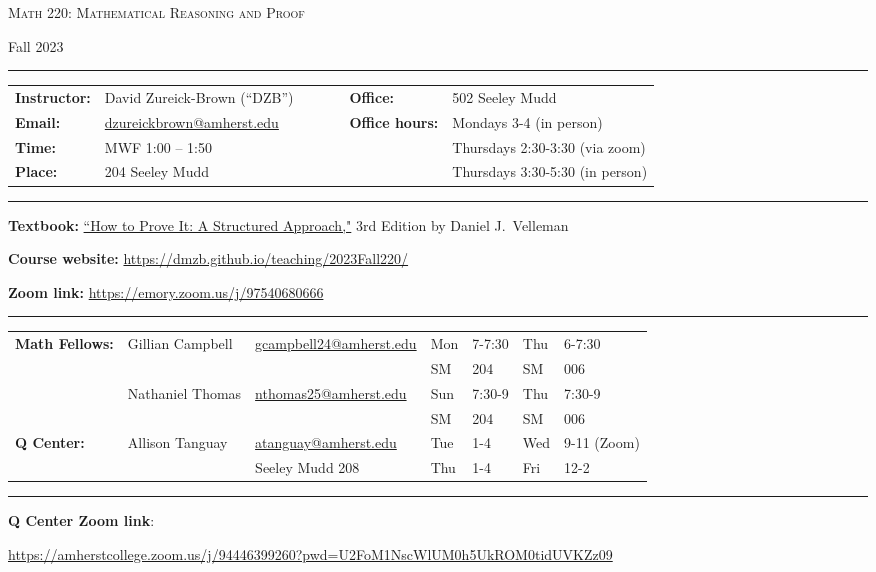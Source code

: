 \documentclass[12pt]{article}
\begin{document}
\begin{center}
{\Large \textsc{Math 220: Mathematical Reasoning and Proof}}
\end{center}
\begin{center}
Fall 2023
\end{center}

\hrule \smallskip

\noindent \begin{tabular}{@{}llcccll}
\textbf{Instructor:} & David Zureick-Brown (``DZB'') & & & & \textbf{Office:} & 502 Seeley Mudd \\
 \textbf{Email:} & \href{mailto: dzureickbrown@amherst.edu}{dzureickbrown@amherst.edu} & & & & \textbf{Office hours:} & Mondays 3-4 (in person)\\
 \textbf{Time:} & MWF 1:00 -- 1:50 & & & & &Thursdays 2:30-3:30 (via zoom) \\
 \textbf{Place:} & 204 Seeley Mudd & & & & & Thursdays 3:30-5:30 (in person)
\end{tabular}

\smallskip \hrule \medskip

\noindent\textbf{Textbook:}
\href{https://www.amazon.com/How-Prove-Structured-Daniel-Velleman/dp/1108439535/}
{``How to Prove It: A Structured Approach,"} 3rd Edition by Daniel J.~Velleman
\medskip

\noindent\textbf{Course website:} \url{https://dmzb.github.io/teaching/2023Fall220/}
\medskip

\noindent\textbf{Zoom link:} \url{https://emory.zoom.us/j/97540680666}

\smallskip \hrule \medskip

\noindent \begin{tabular}{@{}lllllll}

\textbf{Math Fellows:} & Gillian Campbell & \href{mailto: gcampbell24@amherst.edu}{gcampbell24@amherst.edu} & Mon &7-7:30 & Thu & 6-7:30 \\
 & &   & SM & 204 & SM & 006\\ 
                       & Nathaniel Thomas & \href{mailto: nthomas25@amherst.edu}{nthomas25@amherst.edu} & Sun & 7:30-9 & Thu & 7:30-9 \\
 & &   & SM & 204 & SM & 006\\ 

\textbf{Q Center:}& Allison Tanguay & \href{mailto: atanguay@amherst.edu}{atanguay@amherst.edu}  &Tue &1-4 & Wed &9-11 (Zoom) \\
&&Seeley Mudd 208&Thu&1-4&Fri&12-2
\end{tabular}
\smallskip \hrule \medskip          
\noindent\textbf{Q Center Zoom link}:
\begin{center}
  \url{https://amherstcollege.zoom.us/j/94446399260?pwd=U2FoM1NscWlUM0h5UkROM0tidUVKZz09}
\end{center}
\end{document}

